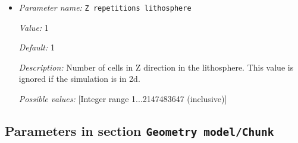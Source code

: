 \begin{itemize}
{\it Value:} 1


{\it Default:} 1


{\it Description:} Number of cells in Z direction of the lower box. This value is ignored if the simulation is in 2d.


{\it Possible values:} [Integer range 1...2147483647 (inclusive)]
\item {\it Parameter name:} {\tt Z repetitions lithosphere}
\label{parameters:Geometry model/Box with lithosphere boundary indicators/Z repetitions lithosphere}


{\it Value:} 1


{\it Default:} 1


{\it Description:} Number of cells in Z direction in the lithosphere. This value is ignored if the simulation is in 2d.


{\it Possible values:} [Integer range 1...2147483647 (inclusive)]
\end{itemize}

\subsection{Parameters in section \tt Geometry model/Chunk}
\label{parameters:Geometry_20model/Chunk}

